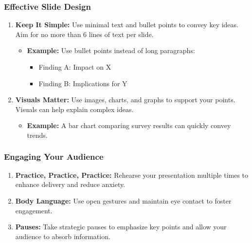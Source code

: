 \documentclass[aspectratio=169]{beamer}
\begin{document}
\begin{frame}[fragile]
    \frametitle{Effective Slide Design}
    \begin{enumerate}
        \item \textbf{Keep It Simple:} Use minimal text and bullet points to convey key ideas. Aim for no more than 6 lines of text per slide.
            \begin{itemize}
                \item \textbf{Example:} Use bullet points instead of long paragraphs:
                \begin{itemize}
                    \item Finding A: Impact on X
                    \item Finding B: Implications for Y
                \end{itemize}
            \end{itemize}
        
        \item \textbf{Visuals Matter:} Use images, charts, and graphs to support your points. Visuals can help explain complex ideas.
            \begin{itemize}
                \item \textbf{Example:} A bar chart comparing survey results can quickly convey trends.
            \end{itemize}
    \end{enumerate}
\end{frame}

\begin{frame}[fragile]
    \frametitle{Engaging Your Audience}
    \begin{enumerate}
        \item \textbf{Practice, Practice, Practice:} Rehearse your presentation multiple times to enhance delivery and reduce anxiety.
        \item \textbf{Body Language:} Use open gestures and maintain eye contact to foster engagement.
        \item \textbf{Pauses:} Take strategic pauses to emphasize key points and allow your audience to absorb information.
    \end{enumerate}
\end{frame}
\end{document}
